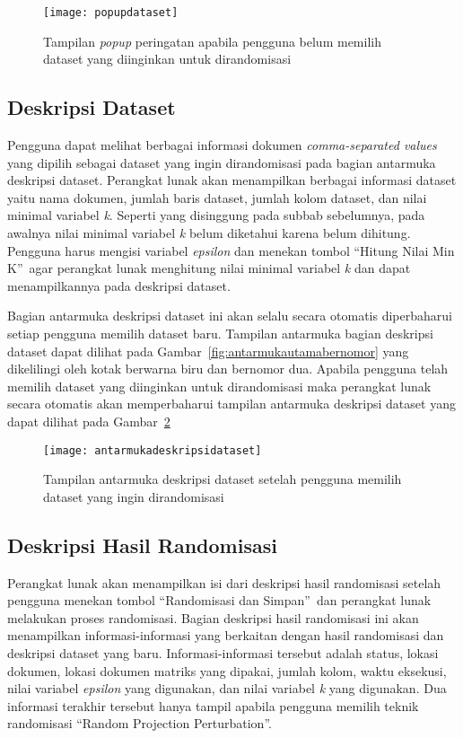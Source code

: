 \begin{figure}
	\centering
	\texttt{[image: popupdataset]}
	\caption{Tampilan \textit{popup} peringatan apabila pengguna belum memilih dataset yang diinginkan untuk dirandomisasi}
	\label{fig:popupdataset}
\end{figure}

\subsection{Deskripsi Dataset}
\label{sec:deskripsidataset}

Pengguna dapat melihat berbagai informasi dokumen \textit{comma-separated values} yang dipilih sebagai dataset yang ingin dirandomisasi pada bagian antarmuka deskripsi dataset. Perangkat lunak akan menampilkan berbagai informasi dataset yaitu nama dokumen, jumlah baris dataset, jumlah kolom dataset, dan nilai minimal variabel \textit{k}. Seperti yang disinggung pada subbab sebelumnya, pada awalnya nilai minimal variabel \textit{k} belum diketahui karena belum dihitung. Pengguna harus mengisi variabel \textit{epsilon} dan menekan tombol \textquotedblleft Hitung Nilai Min K\textquotedblright~agar perangkat lunak menghitung nilai minimal variabel \textit{k} dan dapat menampilkannya pada deskripsi dataset.

Bagian antarmuka deskripsi dataset ini akan selalu secara otomatis diperbaharui setiap pengguna memilih dataset baru. Tampilan antarmuka bagian deskripsi dataset dapat dilihat pada Gambar~\ref{fig:antarmukautamabernomor} yang dikelilingi oleh kotak berwarna biru dan bernomor dua. Apabila pengguna telah memilih dataset yang diinginkan untuk dirandomisasi maka perangkat lunak secara otomatis akan memperbaharui tampilan antarmuka deskripsi dataset yang dapat dilihat pada Gambar~\ref{fig:antarmukadeskripsidataset}

\begin{figure}
	\centering
	\texttt{[image: antarmukadeskripsidataset]}
	\caption{Tampilan antarmuka deskripsi dataset setelah pengguna memilih dataset yang ingin dirandomisasi}
	\label{fig:antarmukadeskripsidataset}
\end{figure}

\subsection{Deskripsi Hasil Randomisasi}
\label{sec:masukanpengaturan}

Perangkat lunak akan menampilkan isi dari deskripsi hasil randomisasi setelah pengguna menekan tombol \textquotedblleft Randomisasi dan Simpan\textquotedblright~dan perangkat lunak melakukan proses randomisasi. Bagian deskripsi hasil randomisasi ini akan menampilkan informasi-informasi yang berkaitan dengan hasil randomisasi dan deskripsi dataset yang baru. Informasi-informasi tersebut adalah status, lokasi dokumen, lokasi dokumen matriks yang dipakai, jumlah kolom, waktu eksekusi, nilai variabel \textit{epsilon} yang digunakan, dan nilai variabel \textit{k} yang digunakan. Dua informasi terakhir tersebut hanya tampil apabila pengguna memilih teknik randomisasi \textquotedblleft Random Projection Perturbation\textquotedblright.

